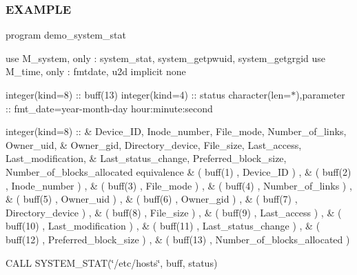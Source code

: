 \subsubsection*{E\+X\+A\+M\+P\+LE}

program demo\+\_\+system\+\_\+stat

use M\+\_\+system, only \+: system\+\_\+stat, system\+\_\+getpwuid, system\+\_\+getgrgid use M\+\_\+time, only \+: fmtdate, u2d implicit none

integer(kind=8) \+:\+: buff(13) integer(kind=4) \+:\+: status character(len=$\ast$),parameter \+:\+: fmt\+\_\+date=\textquotesingle{}year-\/month-\/day hour\+:minute\+:second\textquotesingle{}

integer(kind=8) \+:\+: \& Device\+\_\+\+ID, Inode\+\_\+number, File\+\_\+mode, Number\+\_\+of\+\_\+links, Owner\+\_\+uid, \& Owner\+\_\+gid, Directory\+\_\+device, File\+\_\+size, Last\+\_\+access, Last\+\_\+modification, \& Last\+\_\+status\+\_\+change, Preferred\+\_\+block\+\_\+size, Number\+\_\+of\+\_\+blocks\+\_\+allocated equivalence \& ( buff(1) , Device\+\_\+\+ID ) , \& ( buff(2) , Inode\+\_\+number ) , \& ( buff(3) , File\+\_\+mode ) , \& ( buff(4) , Number\+\_\+of\+\_\+links ) , \& ( buff(5) , Owner\+\_\+uid ) , \& ( buff(6) , Owner\+\_\+gid ) , \& ( buff(7) , Directory\+\_\+device ) , \& ( buff(8) , File\+\_\+size ) , \& ( buff(9) , Last\+\_\+access ) , \& ( buff(10) , Last\+\_\+modification ) , \& ( buff(11) , Last\+\_\+status\+\_\+change ) , \& ( buff(12) , Preferred\+\_\+block\+\_\+size ) , \& ( buff(13) , Number\+\_\+of\+\_\+blocks\+\_\+allocated )

C\+A\+LL S\+Y\+S\+T\+E\+M\+\_\+\+S\+T\+AT(\char`\"{}/etc/hosts\char`\"{}, buff, status)

